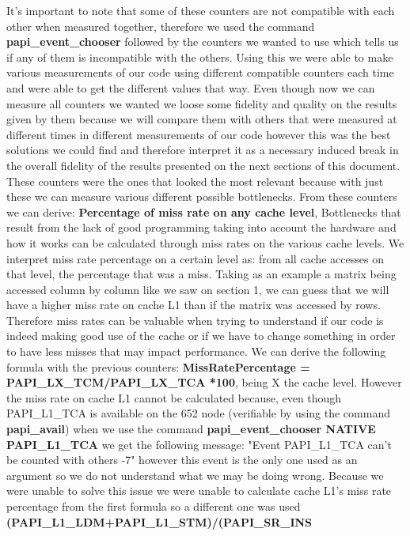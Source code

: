 \documentclass[journal]{IEEEtran}
\begin{document}
It's important to note that some of these counters are not compatible with each other when measured together, therefore we used the command \textbf{papi\_event\_chooser} followed by the counters we wanted to use which tells us if any of them is incompatible with the others. Using this we were able to make various measurements of our code using different compatible counters each time and were able to get the different values that way. Even though now we can measure all counters we wanted we loose some fidelity and quality on the results given by them because we will compare them with others that were measured at different times in different measurements of our code however this was the best solutions we could find and therefore interpret it as a necessary induced break in the overall fidelity of the results presented on the next sections of this document.\\
These counters were the ones that looked the most relevant because with just these we can measure various different possible bottlenecks. From these counters we can derive: \textbf{ Percentage of miss rate on any cache level}, Bottlenecks that result from the lack of good programming taking into account the hardware and how it works can be calculated through miss rates on the various cache levels. We interpret miss rate percentage on a certain level as: from all cache accesses on that level, the percentage that was a miss. Taking as an example a matrix being accessed column by column like we saw on section 1, we can guess that we will have a higher miss rate on cache L1 than if the matrix was accessed by rows. Therefore miss rates can be valuable when trying to understand if our code is indeed making good use of the cache or if we have to change something in order to have less misses that may impact performance. We can derive the following formula with the previous counters: \textbf{MissRatePercentage = PAPI\_LX\_TCM/PAPI\_LX\_TCA *100}, being X the cache level. However the miss rate on cache L1 cannot be calculated because, even though PAPI\_L1\_TCA is available on the 652 node (verifiable by using the command \textbf{papi\_avail}) when we use the command \textbf{papi\_event\_chooser NATIVE PAPI\_L1\_TCA} we get the following message: "Event PAPI\_L1\_TCA can't be counted with others -7" however this event is the only one used as an argument so we do not understand what we may be doing wrong. Because we were unable to solve this issue we were unable to calculate cache L1's miss rate percentage from the first formula so a different one was used \textbf{(PAPI\_L1\_LDM+PAPI\_L1\_STM)/(PAPI\_SR\_INS}\\
\end{document}
